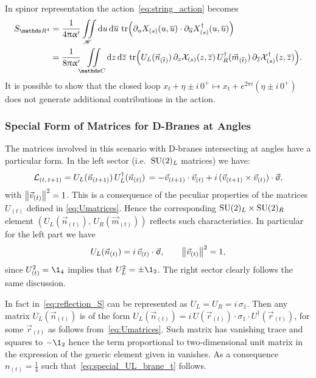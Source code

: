 In spinor representation the action~\eqref{eq:string_action} becomes
\begin{equation}
  \begin{split}
    S_{\R^4}
    & =
    \frac{1}{4 \pi \ap}
    \iint\limits_{\ccH}
    \dd{u} \dd{\baru}\,
    \tr(\ipd{u} X_{(s)}(u, \baru) \cdot \ipd{\baru} X^{\dagger}_{(s)}(u, \baru))
    \\
    & =
    \frac{1}{8 \pi \ap}
    \iint\limits_{\C}
    \dd{z} \dd{\barz}\,
    \tr(
      U_{L}(\vec{n}_{(\bart)})\,
      \ipd{z} \cX_{(s)}(z, \barz)\,
      U_{R}^{\dagger}(\vec{m}_{(\bart)})\,
      \ipd{\barz} \cX_{(s)}^{\dagger}(z, \barz)
    ).
  \end{split}
  \label{eq:action_doubling_fields_spinor_representation}
\end{equation}
It is possible to show that the closed loop $x_t + \eta \pm i\, 0^+ \mapsto x_t + e^{2 \pi i}( \eta \pm i\, 0^+ )$ does not generate additional contributions in the action.


\subsubsection{Special Form of Matrices for D-Branes at Angles} 
\label{sec:special_SO4}

The  matrices involved in this scenario with D-branes intersecting at angles have a particular form.
In the left sector (i.e.\ $\mathrm{SU}(2)_L$ matrices) we have:
\begin{equation}
  \mathcal{L}_{(t,\, t+1)}
  =
  U_{L}(\vec{n}_{(t+1)})\,
  U_{L}^{\dagger}(\vec{n}_{(t)})\,
  =
  -\vec{v}_{(t+1)} \cdot \vec{v}_{(t)}
  +
  i\, (\vec{v}_{(t+1)} \times \vec{v}_{(t)}) \cdot \vec{\upsigma} ,
\end{equation}
with $\norm{\vec{v}_{(t)}}^2 = 1$.
This is a consequence of the peculiar properties of the  matrices $U_{(t)}$ defined in \eqref{eq:Umatrices}.
Hence the corresponding $\mathrm{SU}(2)_L \times \mathrm{SU}(2)_R$ element $(U_{L}(\vec{n}_{(t)}),\, U_{R}(\vec{m}_{(t)}))$ reflects such characteristics.
In particular for the left part we have
\begin{equation}
  U_{L}(\vec{n}_{(t)})
  =
  i\, \vec{v}_{(t)} \cdot \vec{\upsigma},
  \qquad
  \norm{\vec{v}_{(t)}}^2 = 1,
  \label{eq:special_UL_brane_t}
\end{equation}
since $U_{(t)}^2 = \1_4$ implies that $U_{L}^2 = \pm \1_2$.
The right sector clearly follows the same discussion.

In fact \cS in~\eqref{eq:reflection_S} can be represented as $U_{L} = U_{R} = i\, \sigma_1$.
Then any matrix $U_{L}(\vec{n}_{(t)})$ is of the form $U_{L}(\vec{n}_{(t)}) = i\, U(\vec{r}_{(t)}) \cdot \sigma_1 \cdot U^\dagger(\vec{r}_{(t)})$, for some $\vec{r}_{(t)}$ as follows from~\eqref{eq:Umatrices}.
Such matrix has vanishing trace and squares to $-\1_2$ hence the term  proportional to two-dimensional unit matrix in the expression of the generic  element given in  vanishes.
As a consequence $n_{(t)} = \frac{1}{4}$ such that~\eqref{eq:special_UL_brane_t} follows.


